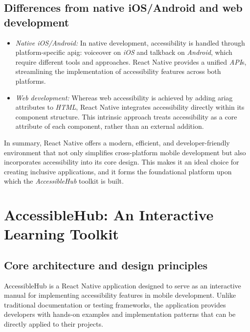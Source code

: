 \subsection{Differences from native iOS/Android and web development}
\begin{itemize}
    \item \textit{Native iOS/Android:}  
    In native development, accessibility is handled through platform-specific \gls{apig}: \gls{voiceover} on \textit{iOS} and \gls{talkback} on \textit{Android}, which require different tools and approaches. React Native provides a unified \textit{API}s, streamlining the implementation of accessibility features across both platforms.
    
    \item \textit{Web development:}  
    Whereas web accessibility is achieved by adding \gls{ariag} attributes to \textit{HTML}, React Native integrates accessibility directly within its component structure. This intrinsic approach treats accessibility as a core attribute of each component, rather than an external addition.
\end{itemize}

In summary, React Native offers a modern, efficient, and developer-friendly environment that not only simplifies cross-platform mobile development but also incorporates accessibility into its core design. This makes it an ideal choice for creating inclusive applications, and it forms the foundational platform upon which the \textit{AccessibleHub} toolkit is built.

\section{AccessibleHub: An Interactive Learning Toolkit}
\label{sec:accessiblehub}

\subsection{Core architecture and design principles}

AccessibleHub is a React Native application designed to serve as an interactive manual for implementing accessibility features in mobile development. Unlike traditional documentation or testing frameworks, the application provides developers with hands-on examples and implementation patterns that can be directly applied to their projects.

